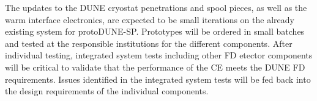 The updates to the DUNE cryostat penetrations and spool pieces, as well as the warm interface electronics, are expected to be small iterations on the already existing system for protoDUNE-SP.  Prototypes will be ordered in small batches and tested at the responsible institutions for the different components.  After individual testing, integrated system tests including other FD etector components will be critical to validate that the performance of the CE meets the DUNE FD requirements.  Issues identified in the integrated system tests will be fed back into the design requirements of the individual components.

